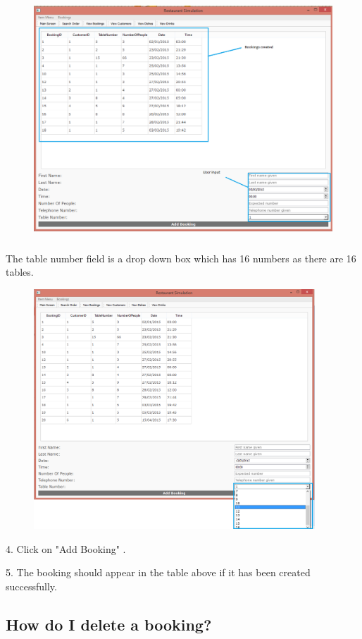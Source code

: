 \begin{figure}[H]
    \includegraphics[height = 9cm]{./Manual/images/AddBooking2} 
    \caption{} \label{fig:addbooking2}
\end{figure}

The table number field is a drop down box which has 16 numbers as there are 16 tables.

\begin{figure}[H]
    \includegraphics[height = 9cm]{./Manual/images/AddBooking3} 
    \caption{} \label{fig:addbooking3}
\end{figure}

4. Click on "Add Booking" .

5. The booking should appear in the table above if it has been created successfully.

\newpage
\subsection{How do I delete a booking?}

